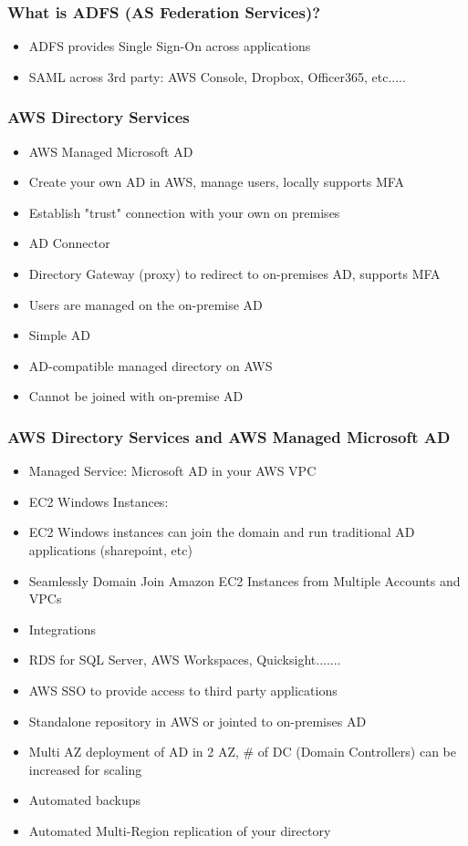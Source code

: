 \subsubsection{What is ADFS (AS Federation Services)?}
\begin{itemize}
    \item ADFS provides Single Sign-On across applications
    \item SAML across 3rd party: AWS Console, Dropbox, Officer365, etc.....
\end{itemize}

\subsubsection{AWS Directory Services}
\begin{itemize}
    \item AWS Managed Microsoft AD
    \item Create your own AD in AWS, manage users, locally supports MFA
    \item Establish "trust" connection with your own on premises
    \item AD Connector
    \item Directory Gateway (proxy) to redirect to on-premises AD, supports MFA
    \item Users are managed on the on-premise AD
    \item Simple AD
    \item AD-compatible managed directory on AWS
    \item Cannot be joined with on-premise AD
\end{itemize}

\subsubsection{AWS Directory Services and AWS Managed Microsoft AD}
\begin{itemize}
    \item Managed Service: Microsoft AD in your AWS VPC
    \item EC2 Windows Instances:
    \item EC2 Windows instances can join the domain and run traditional AD applications (sharepoint, etc)
    \item Seamlessly Domain Join Amazon EC2 Instances from Multiple Accounts and VPCs
    \item Integrations
    \item RDS for SQL Server, AWS Workspaces, Quicksight.......
    \item AWS SSO to provide access to third party applications
    \item Standalone repository in AWS or jointed to on-premises AD
    \item Multi AZ deployment of AD in 2 AZ, # of DC (Domain Controllers) can be increased for scaling
    \item Automated backups
    \item Automated Multi-Region replication of your directory
\end{itemize}


